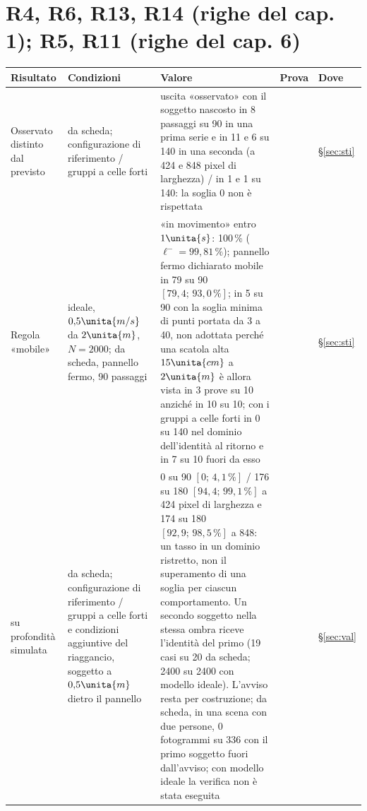 \section*{R4, R6, R13, R14 (righe del cap. 1); R5, R11 (righe del cap. 6)}
\begin{table}[H]\centering\footnotesize
\begin{tabularx}{\textwidth}{@{}>{\RaggedRight\arraybackslash}p{2.8cm}>{\RaggedRight\arraybackslash}p{4.1cm}L>{\RaggedRight\arraybackslash}p{1.2cm}>{\RaggedRight\arraybackslash}p{1.05cm}@{}}
\toprule
Risultato & Condizioni & Valore & Prova & Dove\\
\midrule
Osservato distinto dal previsto & da scheda; configurazione di riferimento / gruppi a celle forti & uscita «osservato» con il soggetto nascosto in 8 passaggi su 90 in una prima serie e in 11 e 6 su 140 in una seconda (a 424 e 848 pixel di larghezza) / in 1 e 1 su 140: la soglia 0 non è rispettata &  & \S\ref{sec:sti}\\
Regola «mobile» & ideale, $0{,}5\unita{m/s}$ da $2\unita{m}$, $N=2000$; da scheda, pannello fermo, 90 passaggi & «in movimento» entro $1\unita{s}$: 100\,\% ($\ell^-=99{,}81\,\%$); pannello fermo dichiarato mobile in 79 su 90 $[79{,}4;\,93{,}0\,\%]$; in 5 su 90 con la soglia minima di punti portata da 3 a 40, non adottata perché una scatola alta $15\unita{cm}$ a $2\unita{m}$ è allora vista in 3 prove su 10 anziché in 10 su 10; con i gruppi a celle forti in 0 su 140 nel dominio dell'identità al ritorno e in 7 su 10 fuori da esso &  & \S\ref{sec:sti}\\
\quad su profondità simulata & da scheda; configurazione di riferimento / gruppi a celle forti e condizioni aggiuntive del riaggancio, soggetto a $0{,}5\unita{m}$ dietro il pannello & 0 su 90 $[0;\,4{,}1\,\%]$ / 176 su 180 $[94{,}4;\,99{,}1\,\%]$ a 424 pixel di larghezza e 174 su 180 $[92{,}9;\,98{,}5\,\%]$ a 848: un tasso in un dominio ristretto, non il superamento di una soglia per ciascun comportamento. Un secondo soggetto nella stessa ombra riceve l'identità del primo (19 casi su 20 da scheda; 2400 su 2400 con modello ideale). L'avviso resta per costruzione; da scheda, in una scena con due persone, 0 fotogrammi su 336 con il primo soggetto fuori dall'avviso; con modello ideale la verifica non è stata eseguita &  & \S\ref{sec:val}\\
\bottomrule
\end{tabularx}
\end{table}
